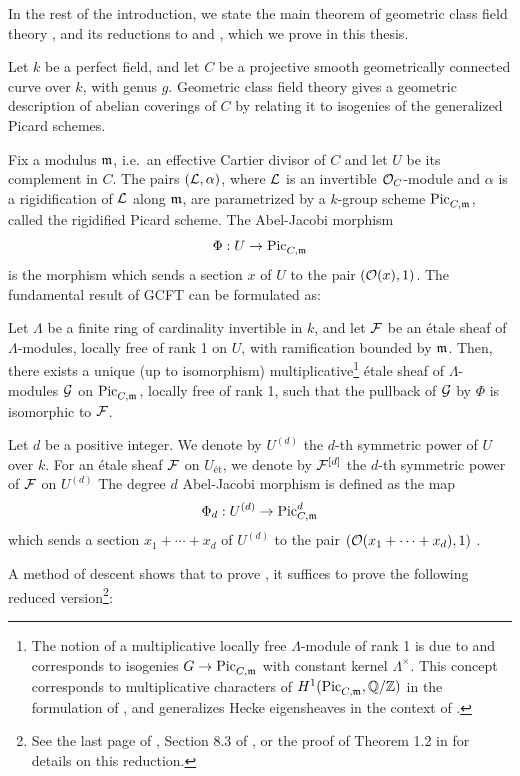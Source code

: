 In the rest of the introduction, we state the main theorem of geometric class field theory , and its reductions to  and , which we prove in this thesis.

Let $k$ be a perfect field, and let $C$ be a projective smooth geometrically connected curve over $k$, with genus $g$. 
Geometric class field theory gives a geometric description of abelian coverings of $C$ by relating it to isogenies of the generalized Picard schemes.

Fix a modulus $\mdls$, i.e.\ an effective Cartier divisor of $C$ and let $U$ be its complement in $C$. 
The pairs $(\cL, \alpha)$, where $\cL$ is an invertible $\cO_C$-module and $\alpha$ is a rigidification of $\cL$ along $\mdls$, are parametrized by a $k$-group scheme $\PicCm$, called the rigidified Picard scheme.
The Abel-Jacobi morphism $$ \Phi : U \to \PicCm $$
is the morphism which sends a section $x$ of $U$ to the pair $(\cO(x), 1)$. 
The fundamental result of GCFT can be formulated as:
\begin{theorem}\label{thm:GCFT}
    Let $\Lambda$ be a finite ring of cardinality invertible in $k$, and let $\cF$ be an \'etale sheaf of $\Lambda$-modules, locally free of rank 1 on $U$, with ramification bounded by $\mdls$. 
    Then, there exists a unique (up to isomorphism) 
    multiplicative\footnote{The notion of a multiplicative locally free $\Lambda$-module of rank 1 is due to \cite{Guignard2018} 
and corresponds to isogenies $G \to \PicCm$ with constant kernel $\Lambda^\times$. 
This concept corresponds to multiplicative characters of $H^1(\PicCm[], \Q/\Z)$ in the formulation of \cite{takeuchi2019blow}, 
and generalizes Hecke eigensheaves in the context of \cite{tendler2015geometricclassfieldtheory}.} 
\'etale sheaf of $\Lambda$-modules $\cG$ on $\PicCm$, locally free of rank 1, such that the pullback of $\cG$ by $\Phi$ is isomorphic to $\cF$.
\end{theorem}

Let $d$ be a positive integer. 
We denote by $U^{(d)}$ the $d$-th symmetric power of $U$ over $k$. 
For an \'etale sheaf $\cF$ on $U_{\text{\'et}}$, we denote by $\cF^{[d]}$ the $d$-th symmetric power of $\cF$ on $U^{(d)}$ 
The degree $d$ Abel-Jacobi morphism is defined as the map
$$ \Phi_d : U^{(d)} \to \PicCm[d] $$
which sends a section $x_1 + \cdots + x_d$ of $U^{(d)}$ to the pair $(\cO(x_1 + \cdots + x_d), 1)$ .

A method of descent shows that to prove , 
it suffices to prove the following reduced version\footnote{See the last page of \cite{Guignard2018}, 
Section 8.3 of \cite{tendler2015geometricclassfieldtheory}, or the proof of Theorem 1.2 in \cite{takeuchi2019blow} for details on this reduction.}:

